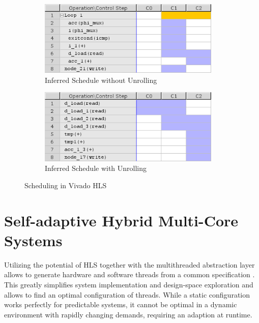 \begin{figure}[tb]
	\centering
	\begin{subfigure}{0.49\textwidth}
		\centering
		\includegraphics[width=0.95\textwidth]{../figures/hls_n}
		\caption{Inferred Schedule without Unrolling}
		\label{fig:hls_n}
	\end{subfigure}
	\begin{subfigure}{0.49\textwidth}
		\centering
		\includegraphics[width=0.95\textwidth]{../figures/hls_u}
		\caption{Inferred Schedule with Unrolling}
		\label{fig:hls_u}
	\end{subfigure}
	\caption{Scheduling in Vivado HLS}
	\label{fig:hls}
\end{figure}

\section{Self-adaptive Hybrid Multi-Core Systems}
Utilizing the potential of \ac{HLS} together with the multithreaded
abstraction layer allows to generate hardware and software threads from a
common specification \citep{CBN11}. This greatly simplifies system
implementation and design-space exploration and allows to find an optimal
configuration of threads. While a static configuration works perfectly for
predictable systems, it cannot be optimal in a dynamic environment with
rapidly changing demands, requiring an adaption at runtime.

